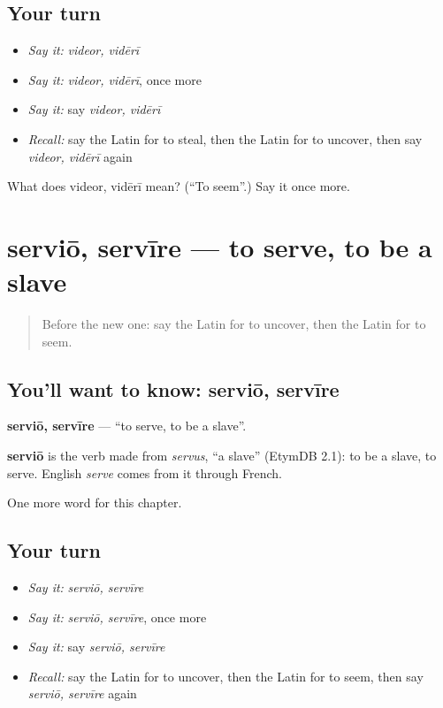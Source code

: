 \subsection*{Your turn}
\begin{itemize}
\raggedright
  \item \emph{Say it:} \emph{videor, vidērī}
  \item \emph{Say it:} \emph{videor, vidērī}, once more
  \item \emph{Say it:} say \emph{videor, vidērī}
  \item \emph{Recall:} say the Latin for to steal, then the Latin for to uncover, then say \emph{videor, vidērī} again
\end{itemize}

\begin{tcolorbox}[breakable,colback=teal!4,colframe=teal!35!black,title={Before you move on}]
What does videor, vidērī mean? (\textquotedblleft{}To seem\textquotedblright{}.) Say it once more.
\end{tcolorbox}
\section[serviō, servīre]{serviō, servīre — to serve, to be a slave}

\label{lesson:LA-C232-servio}



\begin{quote}
Before the new one: say the Latin for to uncover, then the Latin for to seem.
\end{quote}

\subsection*{You'll want to know: serviō, servīre}
\textbf{serviō, servīre} — \textquotedblleft{}to serve, to be a slave\textquotedblright{}.

\begin{cousinweb}
\textbf{serviō} is the verb made from \emph{servus}, \textquotedblleft{}a slave\textquotedblright{} (EtymDB 2.1): to be a slave, to serve. English \emph{serve} comes from it through French.
\end{cousinweb}

\begin{grammarlens}[title={What you've built}]
One more word for this chapter.
\end{grammarlens}

\subsection*{Your turn}
\begin{itemize}
\raggedright
  \item \emph{Say it:} \emph{serviō, servīre}
  \item \emph{Say it:} \emph{serviō, servīre}, once more
  \item \emph{Say it:} say \emph{serviō, servīre}
  \item \emph{Recall:} say the Latin for to uncover, then the Latin for to seem, then say \emph{serviō, servīre} again
\end{itemize}

